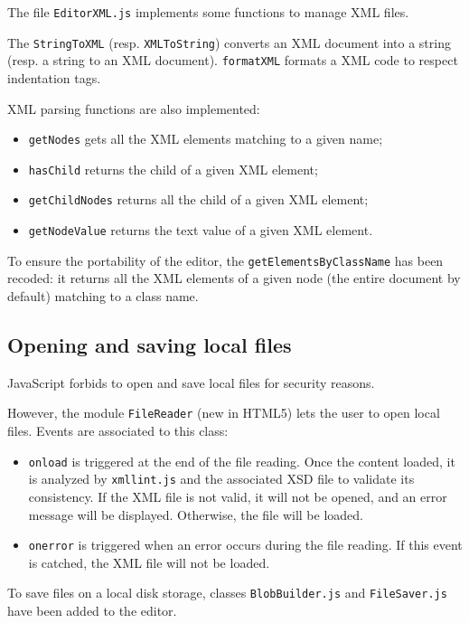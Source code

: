 \documentclass{article}
\begin{document}
The file \texttt{EditorXML.js} implements some functions to manage XML files.
\newline

\noindent The \texttt{StringToXML} (resp. \texttt{XMLToString}) converts an XML document into a string (resp. a string to an XML document). \texttt{formatXML} formats a XML code to respect indentation tags.
\newline

\noindent XML parsing functions are also implemented:
\begin{itemize}
\item \texttt{getNodes} gets all the XML elements matching to a given name;
\item \texttt{hasChild} returns the child of a given XML element;
\item \texttt{getChildNodes} returns all the child of a given XML element;
\item \texttt{getNodeValue} returns the text value of a given XML element.
\end{itemize}

\noindent To ensure the portability of the editor, the \texttt{getElementsByClassName} has been recoded: it returns all the XML elements of a given node (the entire document by default) matching to a class name.

\subsection{Opening and saving local files}

JavaScript forbids to open and save local files for security reasons.
\newline

\noindent However, the module \texttt{FileReader} (new in HTML5) lets the user to open local files. Events are associated to this class:
\begin{itemize}
\item \texttt{onload} is triggered at the end of the file reading. Once the content loaded, it is analyzed by \texttt{xmllint.js} and the associated XSD file to validate its consistency. If the XML file is not valid, it will not be opened, and an error message will be displayed. Otherwise, the file will be loaded.
\item \texttt{onerror} is triggered when an error occurs during the file reading. If this event is catched, the XML file will not be loaded.
\end{itemize}

\noindent To save files on a local disk storage, classes \texttt{BlobBuilder.js} and \texttt{FileSaver.js} have been added to the editor.
\end{document}
